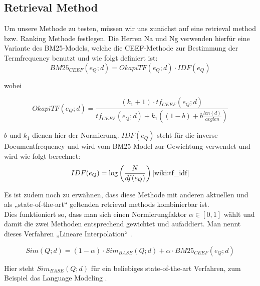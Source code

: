 \subsection{Retrieval Method}

Um unsere Methode zu testen, müssen wir uns zunächst auf eine retrieval method bzw. Ranking Methode festlegen. Die Herren Na und Ng verwenden hierfür eine Variante des BM25-Models, welche die CEEF-Methode zur Bestimmung der Termfrequency benutzt und wie folgt definiert ist:
\[ BM25_{CEEF}(e_Q;d) = OkapiTF(e_Q;d) \cdot IDF(e_Q) \]

wobei

\[ OkapiTF(e_Q;d) = \frac{ (k_1 + 1) \cdot tf_{CEEF}(e_Q;d)}{tf_{CEEF}(e_Q;d) + k_1\left( (1-b) + b \frac{len(d)}{avglen} \right)} \]

$b$ und $k_1$ dienen hier der Normierung. $IDF(e_Q)$ steht für die inverse Documentfrequency und wird vom BM25-Model zur Gewichtung verwendet und wird wie folgt berechnet:
\[ IDF(e_Q) = \log \left( \frac{N}{df(e_Q)} \right) \text{\cite{wiki:tf_idf}} \]

Es ist zudem noch zu erwähnen, dass diese Methode mit anderen aktuellen und als „state-of-the-art“ geltenden retrieval methods kombinierbar ist.\\
Dies funktioniert so, dass man sich einen Normierungfaktor $\alpha \in [0,1]$ wählt und damit die zwei Methoden entsprechend gewichtet und aufaddiert. Man nennt dieses Verfahren „Lineare Interpolation“ \cite{paper:Vogt}. 

\[ Sim(Q;d) = (1-\alpha) \cdot Sim_{BASE}(Q;d) + \alpha \cdot BM25_{CEEF}(e_Q;d) \]

Hier steht $Sim_{BASE}(Q;d)$ für ein beliebiges state-of-the-art Verfahren, zum Beispiel das Language Modeling \cite{paper:Zhai1}\cite{paper:Zhai2}.
